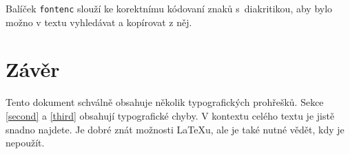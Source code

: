 \documentclass[twocolumn, a4paper, 10pt]{article}
\begin{document}
Balíček \texttt{fontenc} slouží ke korektnímu kódovaní znaků s~diakritikou, aby bylo možno v textu vyhledávat a kopírovat z něj.

\section{Závěr}
Tento dokument schválně obsahuje několik typografických prohřešků. Sekce \ref{second} a \ref{third} obsahují typografické chyby. V kontextu celého textu je jistě snadno najdete. Je dobré znát možnosti \LaTeX u, ale je také nutné vědět, kdy je nepoužít.
\end{document}
